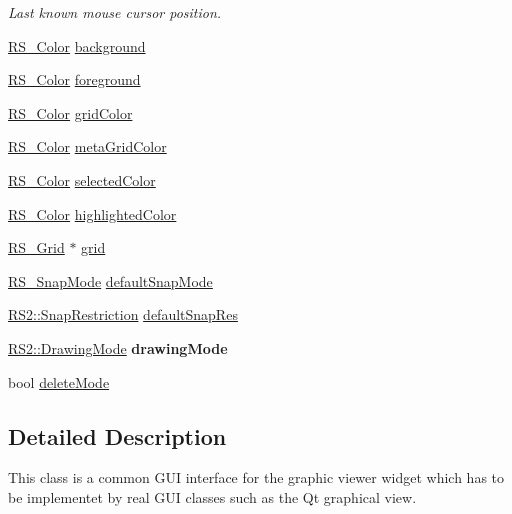 \begin{DoxyCompactItemize}
\begin{DoxyCompactList}\small\item\em Last known mouse cursor position. \end{DoxyCompactList}\item 
\hyperlink{classRS__Color}{R\-S\-\_\-\-Color} \hyperlink{classRS__GraphicView_a13f323ad576fa42d5c1003d025ea9f9a}{background}
\item 
\hyperlink{classRS__Color}{R\-S\-\_\-\-Color} \hyperlink{classRS__GraphicView_a9fdb72ef87525be0a3f1fe665d6025d8}{foreground}
\item 
\hyperlink{classRS__Color}{R\-S\-\_\-\-Color} \hyperlink{classRS__GraphicView_af566f6066c667e51e37112e13cedc3b2}{grid\-Color}
\item 
\hyperlink{classRS__Color}{R\-S\-\_\-\-Color} \hyperlink{classRS__GraphicView_a50193620c821e86e68a7b914bff7afd1}{meta\-Grid\-Color}
\item 
\hyperlink{classRS__Color}{R\-S\-\_\-\-Color} \hyperlink{classRS__GraphicView_a7c3c832cd4ed3ea5c7ab5af2a07eeee9}{selected\-Color}
\item 
\hyperlink{classRS__Color}{R\-S\-\_\-\-Color} \hyperlink{classRS__GraphicView_adf461ce844a72d1b839d5925775d5c99}{highlighted\-Color}
\item 
\hyperlink{classRS__Grid}{R\-S\-\_\-\-Grid} $\ast$ \hyperlink{classRS__GraphicView_a6396487e060f415b8447c81d73c4e3c1}{grid}
\item 
\hyperlink{structRS__SnapMode}{R\-S\-\_\-\-Snap\-Mode} \hyperlink{classRS__GraphicView_aa018f550964aa34a859d0fbe36ddfd1d}{default\-Snap\-Mode}
\item 
\hyperlink{classRS2_aac67b6890a08cff619c0fbef48377bae}{R\-S2\-::\-Snap\-Restriction} \hyperlink{classRS__GraphicView_a3d48dce5acf1be807ecc8cb22416eb84}{default\-Snap\-Res}
\item 
\hypertarget{classRS__GraphicView_abf4123c4c3445c95bd680922898302bd}{\hyperlink{classRS2_a67196f135592d0f8eff894bd126685b2}{R\-S2\-::\-Drawing\-Mode} {\bfseries drawing\-Mode}}\label{classRS__GraphicView_abf4123c4c3445c95bd680922898302bd}

\item 
bool \hyperlink{classRS__GraphicView_a2b1b20553b1fa0a2ae02d807a25a9ff2}{delete\-Mode}
\end{DoxyCompactItemize}


\subsection{Detailed Description}
This class is a common G\-U\-I interface for the graphic viewer widget which has to be implementet by real G\-U\-I classes such as the Qt graphical view.

